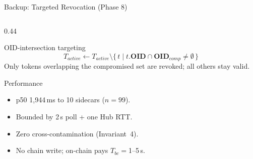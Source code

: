 \documentclass[aspectratio=169,11pt]{beamer}
\newcommand{\tightitems}{%
  \setlength{\topsep}{2pt}%
  \setlength{\itemsep}{4pt}%
  \setlength{\parsep}{0pt}%
}
\begin{document}
{\begin{frame}[noframenumbering]{Backup: Targeted Revocation (Phase 8)}
\begin{columns}[T,onlytextwidth]
\begin{column}{0.44\textwidth}
\begin{callout}{OID-intersection targeting}
\tiny
\[
T_{active} \leftarrow T_{active} \setminus
\bigl\{\,t \mid t.\mathbf{OID} \cap \mathbf{OID}_{comp} \neq \emptyset\,\bigr\}
\]
\vspace{-4pt}
Only tokens overlapping the compromised set are revoked; all others stay valid.
\end{callout}
\vspace{-0.4cm}
\begin{callout}{Performance}
\tiny
\begin{itemize}\tightitems
\item p50 1{,}944\,ms to 10 sidecars ($n{=}99$).
\vspace{-0.15cm}
\item Bounded by 2\,s poll + one Hub RTT.
\vspace{-0.15cm}
\item Zero cross-contamination (Invariant~4).
\vspace{-0.15cm}
\item No chain write; on-chain pays $T_{bc}{=}$1--5\,s.
\end{itemize}
\end{callout}
\end{column}
\end{columns}
\end{frame}

}
\end{document}

